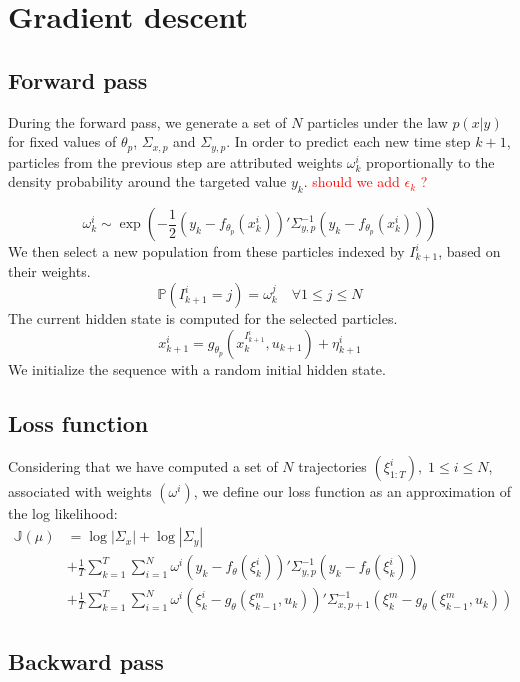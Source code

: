 \documentclass[10pt,a4paper]{report}
\begin{document}
\section{Gradient descent}
\label{sec:gradient_descent}

\subsection{Forward pass}
During the forward pass, we generate a set of $N$ particles under the law $p(x|y)$ for fixed values of $\theta_p$, $\Sigma_{x, p}$ and $\Sigma_{y, p}$.
In order to predict each new time step $k+1$, particles from the previous step are attributed weights $\omega_k^i$ proportionally to the density probability around the targeted value $y_k$.
\textcolor{red}{should we add $\epsilon_k$ ?}

$$\omega_k^i \sim \exp(-\frac{1}{2}(y_k - f_{\theta_p}(x_k^i))'\Sigma^{-1}_{y, p}(y_k - f_{\theta_p}(x_k^i)))$$
We then select a new population from these particles indexed by $I_{k+1}^i$, based on their weights.
$$\mathbb{P}(I_{k+1}^i=j) = \omega_k^j \quad \forall 1 \leq j \leq N$$
The current hidden state is computed for the selected particles.
$$x^i_{k+1} = g_{\theta_p}(x_k^{I_{k+1}^i}, u_{k+1}) + \eta^i_{k+1}$$
We initialize the sequence with a random initial hidden state.

\subsection{Loss function}
Considering that we have computed a set of $N$ trajectories $(\xi^i_{1:T}),\;1 \leq i \leq N$, associated with weights $(\omega^i)$, we define our loss function as an approximation of the log likelihood:
\begin{align*}
    \mathbb{J}(\mu) & = \log |\Sigma_x| + \log |\Sigma_y|                                                                                                               \\
                    & + \frac{1}{T}\sum_{k=1}^T \sum_{i=1}^N \omega^i (y_k - f_\theta(\xi_k^i))' \Sigma_{y, p}^{-1} (y_k - f_\theta(\xi_k^i))                           \\
                    & + \frac{1}{T}\sum_{k=1}^T \sum_{i=1}^N \omega^i (\xi_k^i - g_\theta(\xi_{k-1}^m, u_k))'\Sigma_{x, p+1}^{-1}(\xi_k^m - g_\theta(\xi_{k-1}^m, u_k))
\end{align*}

\subsection{Backward pass}
\end{document}
